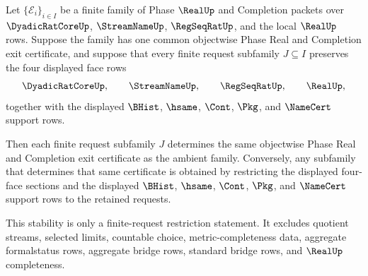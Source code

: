 \begin{theorem}
\label{thm:real-l10-finite-request-subfamily-exit-stability}
Let $\{\mathcal E_i\}_{i \in I}$ be a finite family of Phase $\RealUp$ and Completion packets over $\DyadicRatCoreUp$, $\StreamNameUp$, $\RegSeqRatUp$, and the local $\RealUp$ rows. Suppose the family has one common objectwise Phase Real and Completion exit certificate, and suppose that every finite request subfamily $J \subseteq I$ preserves the four displayed face rows
$$
\DyadicRatCoreUp,\qquad \StreamNameUp,\qquad \RegSeqRatUp,\qquad \RealUp,
$$
together with the displayed $\BHist$, $\hsame$, $\Cont$, $\Pkg$, and $\NameCert$ support rows.

Then each finite request subfamily $J$ determines the same objectwise Phase Real and Completion exit certificate as the ambient family. Conversely, any subfamily that determines that same certificate is obtained by restricting the displayed four-face sections and the displayed $\BHist$, $\hsame$, $\Cont$, $\Pkg$, and $\NameCert$ support rows to the retained requests.

This stability is only a finite-request restriction statement. It excludes quotient streams, selected limits, countable choice, metric-completeness data, aggregate formalstatus rows, aggregate bridge rows, standard bridge rows, and $\RealUp$ completeness.
\end{theorem}
